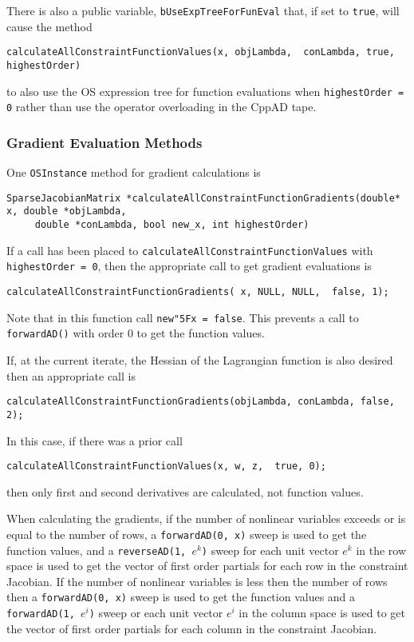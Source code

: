 \documentclass[11pt]{article}
\renewcommand{\_}{{\char"5F}}
\renewcommand{\{}{{\char"7B}}
\renewcommand{\}}{{\char"7D}}
\renewcommand{\^}{{\char"0D}}
\renewcommand{\'}{{\char"0D}}
\begin{document}
There is also a public variable, {\tt bUseExpTreeForFunEval} that, if set to {\tt true}, will cause the method
\begin{verbatim}
calculateAllConstraintFunctionValues(x, objLambda,  conLambda, true, highestOrder)
\end{verbatim}
to also use the OS expression tree for function evaluations when {\tt highestOrder = 0} rather than use the operator overloading in the CppAD tape.

\subsubsection{Gradient Evaluation Methods}

One {\tt OSInstance} method for gradient calculations is
\begin{verbatim}
SparseJacobianMatrix *calculateAllConstraintFunctionGradients(double* x, double *objLambda, 
     double *conLambda, bool new_x, int highestOrder)
\end{verbatim}
If a call has been placed to {\tt calculateAllConstraintFunctionValues} with {\tt highestOrder = 0}, then the appropriate call to get gradient evaluations is
\begin{verbatim}
calculateAllConstraintFunctionGradients( x, NULL, NULL,  false, 1);
\end{verbatim}
Note that in this function call {\tt new\_x = false}. This prevents a call to {\tt forwardAD()} with order 0 to get the function values. 


If, at the current iterate, the Hessian of the Lagrangian function is also desired then an appropriate call is
\begin{verbatim}
calculateAllConstraintFunctionGradients(objLambda, conLambda, false, 2);
\end{verbatim}
In this case, if there was a prior call 
\begin{verbatim}
calculateAllConstraintFunctionValues(x, w, z,  true, 0);
\end{verbatim}
then only first and second derivatives are calculated, not function values. 

When calculating the gradients, if the number of nonlinear variables exceeds or is equal  to the number of rows,  a {\tt forwardAD(0, x)} sweep is used to get the function values,  and   a {\tt reverseAD(1, $e^{k}$)}  sweep for each unit vector  $e^{k}$ in the row space  is used to get the vector of first order partials for each row in the constraint Jacobian.  If the number of nonlinear variables is less then the number of rows then a {\tt forwardAD(0, x)} sweep  is used to get the function values and a {\tt forwardAD(1,  $e^{i}$)}  sweep or each unit vector  $e^{i}$ in the column space is used to get the vector of first order partials for each column in the constraint Jacobian. 
\end{document}
